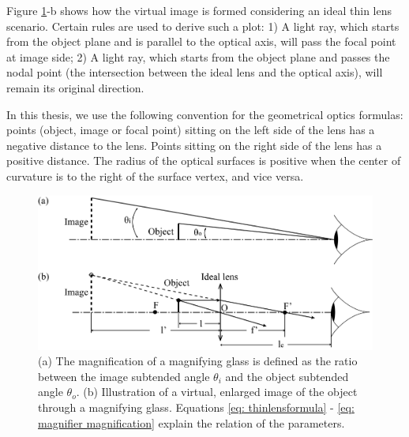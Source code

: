 Figure \ref{fig: geo_formulae}-b shows how the virtual image is formed considering an ideal thin lens scenario. Certain rules are used to derive such a plot:
1) A light ray, which starts from the object plane and is parallel to the optical axis, will pass the focal point at image side;
2) A light ray, which starts from the object plane and passes the nodal point (the intersection between the ideal lens and the optical axis), will remain its original direction.

In this thesis, we use the following convention for the geometrical optics formulas: points (object, image or focal point) sitting on the left side of the lens has a negative distance to the lens. Points sitting on the right side of the lens has a positive distance. The radius of the optical surfaces is positive when the center of curvature is to the right of the surface vertex, and vice versa. 

\begin{figure}
    \centering
    \includegraphics[scale=0.58]{chapter-1/figures/geo_magnifier_v2.png}
    \caption{(a) The magnification of a magnifying glass is defined as the ratio between the image subtended angle $\theta_{i}$ and  the object subtended angle $\theta_{o}$.  
    (b) Illustration of a virtual, enlarged image of the object through a magnifying glass. Equations \ref{eq: thinlensformula} - \ref{eq: magnifier magnification} explain the relation of the parameters.}
    \label{fig: geo_formulae}
\end{figure} 

